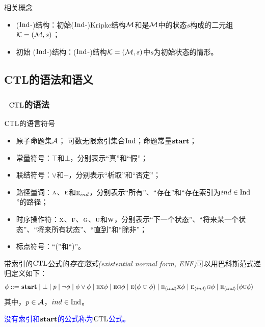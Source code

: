 \documentclass[9pt, CJK]{beamer}
\begin{document}
\begin{frame}
{		%
		\begin{block}{相关概念}
			\begin{itemize}
				\item \textcolor{blue!80}{($\textrm{Ind}$-)结构}：初始($\textrm{Ind}$-)Kripke结构${\cal M}$和是${\cal M}$中的状态$s$构成的二元组${\cal K}=({\cal M}, s)$；
				\item \textcolor{blue!80}{初始 ($\textrm{Ind}$-)结构}：($\textrm{Ind}$-)结构${\cal K}=({\cal M}, s)$中$s$为初始状态的情形。
			\end{itemize} 
			
		\end{block}
	}
\end{frame}


\subsection{CTL的语法和语义}
\begin{frame} 
	\frametitle{~$\textrm{CTL}$的语法}
	{\footnotesize 
		\begin{block}{$\textrm{CTL}$的语言符号}
			\begin{itemize}
				\item 原子命题集${\cal A}$； \quad 可数无限索引集合$\textrm{Ind}$；\quad 命题常量$\textbf{start}$；
				\item 常量符号：$\top$和$\bot$，分别表示“真”和“假”；
				\item 联结符号：$\vee$和$\neg$，分别表示“析取”和“否定”；
				\item 路径量词：$\textsc{a}$、$\textsc{e}$和$\textsc{e}_{ind}$，分别表示“所有”、“存在”和“存在索引为$ind\in \textrm{Ind}$”的路径；
				\item 时序操作符：$\textsc{x}$、$\textsc{f}$、$\textsc{g}$、$\textsc{u}$和$\textsc{w}$，分别表示“下一个状态”、“将来某一个状态”、“将来所有状态”、“直到”和“除非”；
				\item 标点符号：“(”和“)”。
			\end{itemize}
		\end{block}
		\begin{definition}
			带索引的$\textrm{CTL}$公式的\emph{存在范式(existential normal form, ENF)}可以用巴科斯范式递归定义如下：
			\begin{align*}
				\phi  ::= & \ \start\mid \bot %
				\mid p \mid\neg\phi \mid \phi\lor\phi \mid
				\EXIST \NEXT \phi \mid
				\EXIST \GLOBAL \phi \mid 
				\EXIST (\phi\ \UNTILL\ \phi)\mid 
				\EXIST_{\tuple{ind}}\NEXT \phi  \mid 
				\EXIST_{\tuple{ind}}\GLOBAL \phi \mid
				\EXIST_{\tuple{ind}}(\phi \UNTILL \phi)  
			\end{align*}
			其中，$p\in {\cal A}$，$ind \in \textrm{Ind}$。
			
			\textcolor{blue}{没有索引和$\textbf{start}$的公式称为$\textrm{CTL}$公式。}
		\end{definition} 
	}
\end{frame}
\end{document}
